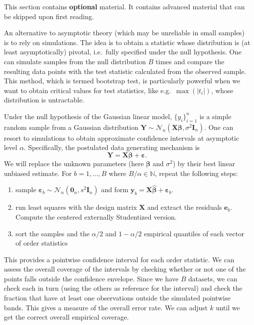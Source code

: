 \documentclass[]{book}
\theoremstyle{definition}
\theoremstyle{definition}
\theoremstyle{definition}
\theoremstyle{remark}
\begin{document}
This section contains \textbf{optional} material. It contains advanced material that can be skipped upon first reading.

An alternative to asymptotic theory (which may be unreliable in small samples) is to rely on simulations. The idea is to obtain a statistic whose distribution is (at least asymptotically) pivotal, i.e.~fully specified under the null hypothesis. One can simulate samples from the null distribution \(B\) times and compare the resulting data points with the test statistic calculated from the observed sample. This method, which is termed bootstrap test, is particularly powerful when we want to obtain critical values for test statistics, like e.g.~\(\max(|t_i|)\), whose distribution is untractable.

Under the null hypothesis of the Gaussian linear model, \(\{y_i\}_{i=1}^n\) is a simple random sample from a Gaussian distribution \(\boldsymbol{Y} \sim \mathcal{N}_n(\mathbf{X}\boldsymbol{\beta}, \sigma^2 \mathbf{I}_n)\). One can resort to simulations to obtain approximate confidence intervals at asymptotic level \(\alpha\). Specifically, the postulated data generating mechanism is \[\boldsymbol{Y} = \mathbf{X}\boldsymbol{\beta} + \boldsymbol{\varepsilon}.\]
We will replace the unknown parameters (here \(\boldsymbol{\beta}\) and \(\sigma^2\)) by their best linear unbiased estimate. For \(b=1, \ldots, B\) where \(B/\alpha \in \mathbb{N}\), repeat the following steps:

\begin{enumerate}
\item sample $\boldsymbol{\varepsilon}_{b} \sim \mathcal{N}_n(\boldsymbol{0}_n, s^2\mathbf{I}_n)$ and form $\boldsymbol{y}_b = \mathbf{X} \hat{\boldsymbol{\beta}} + \boldsymbol{\varepsilon}_{b}$. 
\item run least squares with the design matrix $\mathbf{X}$ and extract the residuals $\boldsymbol{e}_b$. Compute 
the centered externally Studentized version.
\item sort the samples and the $\alpha/2$ and $1-\alpha/2$ empirical quantiles of each vector of order statistics
\end{enumerate}

This provides a pointwise confidence interval for each order statistic. We can assess the overall coverage of the intervals by checking whether or not one of the points falls outside the confidence envelope. Since we have \(B\) datasets, we can check each in turn (using the others as reference for the interval) and check the fraction that have at least one observations outside the simulated pointwise bands. This gives a measure of the overall error rate. We can adjust \(k\) until we get the correct overall empirical coverage.
\end{document}
